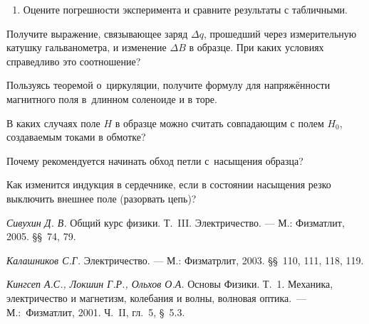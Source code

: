 \begin{lab:task}
\begin{enumerate}
		\item Оцените погрешности эксперимента и сравните
        результаты с табличными.


	\end{enumerate}

\end{lab:task}

\begin{lab:questions}

	\item Получите выражение, связывающее заряд $\Delta q$, прошедший через
    измерительную катушку гальванометра, и изменение $\Delta B$ в образце.
    При каких условиях справедливо это соотношение?

	\item Пользуясь теоремой о~циркуляции, получите формулу для напряжённости
магнитного поля в~длинном соленоиде и в торе.

    \item В каких случаях поле $H$ в образце можно считать совпадающим
    с полем $H_0$, создаваемым токами в обмотке?

    \item Почему рекомендуется начинать обход петли с~насыщения образца?

    \item Как изменится индукция в сердечнике, если в состоянии насыщения
    резко выключить внешнее поле (разорвать цепь)?
\end{lab:questions}

\begin{lab:literature}

	\item \textit{Сивухин Д. В.} Общий курс физики. Т.~III. Электричество. --- М.:
Физматлит, 2005. \S\S~74, 79.

	\item \textit{Калашников С.Г.} Электричество. --- М.: Физматрлит, 2003.
\S\S~110, 111, 118, 119.

	\item \textit{Кингсеп А.С., Локшин Г.Р., Ольхов О.А.} Основы Физики. Т.~1.
Механика, электричество и магнетизм, колебания и
	волны, волновая оптика.~--- М.:~Физматлит, 2001. Ч.~II, гл.~5, \S~5.3.

\end{lab:literature}
